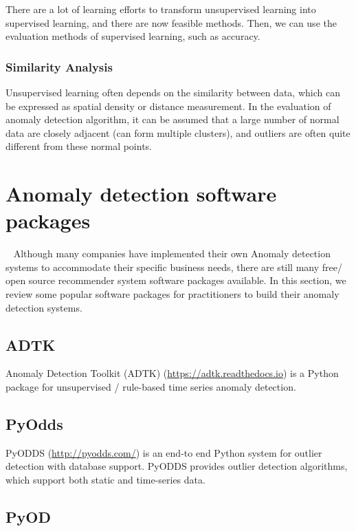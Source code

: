 There are a lot of learning efforts to transform 
unsupervised learning into supervised learning, 
and there are now feasible methods. 
Then, 
we can use the evaluation methods of supervised learning, 
such as accuracy.

\subsubsection{Similarity Analysis}

Unsupervised learning often depends 
on the similarity between data, 
which can be expressed as spatial density 
or distance measurement. 
In the evaluation of anomaly detection algorithm, 
it can be assumed that a large number of normal 
data are closely adjacent (can form multiple clusters), 
and outliers are often quite different from these normal points.

\section{Anomaly detection software packages}~\label{sec:tools}
Although many companies have implemented their own Anomaly detection systems
to accommodate their specific business needs,
there are still many free/ open source recommender system
software packages available.
In this section,
we review some popular software packages for practitioners
to build their anomaly detection systems.

\subsection{ADTK}

Anomaly Detection Toolkit (ADTK) (\href{https://adtk.readthedocs.io}{https://adtk.readthedocs.io}) is a Python package for
unsupervised / rule-based time series anomaly detection.

\subsection{PyOdds}

PyODDS (\href{http://pyodds.com/}{http://pyodds.com/}) is an end-to end Python system for
outlier detection with database support.
PyODDS provides outlier detection algorithms,
which support both static and time-series data.

\subsection{PyOD}

